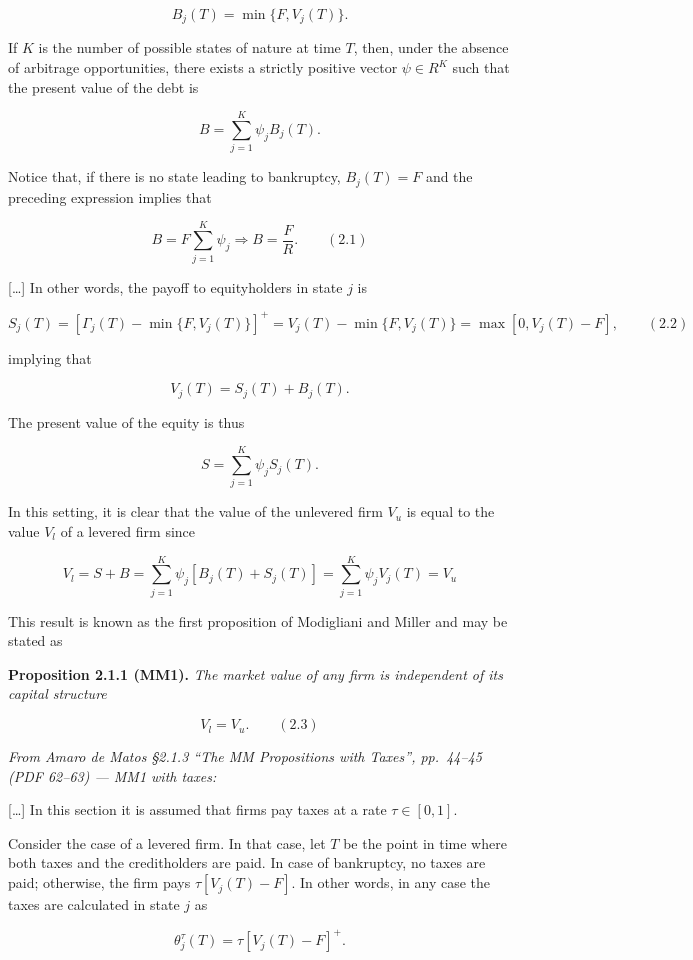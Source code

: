 \documentclass[11pt,a4paper]{article}
\numberwithin{equation}{section}
\begin{document}
\[B_j(T) = \min\{F, V_j(T)\}.\]

If \(K\) is the number of possible states of nature at time \(T\), then, under the absence of
arbitrage opportunities, there exists a strictly positive vector \(\psi \in R^K\) such that the
present value of the debt is

\[B = \sum_{j=1}^{K} \psi_j B_j(T).\]

Notice that, if there is no state leading to bankruptcy, \(B_j(T) = F\) and the preceding expression
implies that

\[B = F \sum_{j=1}^{K} \psi_j \Rightarrow B = \frac{F}{R}. \qquad (2.1)\]

{[}\ldots{]} In other words, the payoff to equityholders in state \(j\) is

\[S_j(T) = [\Gamma_j(T) - \min\{F, V_j(T)\}]^+ = V_j(T) - \min\{F, V_j(T)\} = \max[0, V_j(T) - F], \qquad (2.2)\]

implying that

\[V_j(T) = S_j(T) + B_j(T).\]

The present value of the equity is thus

\[S = \sum_{j=1}^{K} \psi_j S_j(T).\]

In this setting, it is clear that the value of the unlevered firm \(V_u\) is equal to the value
\(V_l\) of a levered firm since

\[V_l = S + B = \sum_{j=1}^{K} \psi_j [B_j(T) + S_j(T)] = \sum_{j=1}^{K} \psi_j V_j(T) = V_u\]

This result is known as the first proposition of Modigliani and Miller and may be stated as

\textbf{Proposition 2.1.1 (MM1).} \emph{The market value of any firm is independent of its capital
structure}

\[V_l = V_u. \qquad (2.3)\]

\emph{From Amaro de Matos §2.1.3 ``The MM Propositions with Taxes'', pp.~44--45 (PDF 62--63) --- MM1
with taxes:}

{[}\ldots{]} In this section it is assumed that firms pay taxes at a rate \(\tau \in [0, 1]\).

Consider the case of a levered firm. In that case, let \(T\) be the point in time where both taxes
and the creditholders are paid. In case of bankruptcy, no taxes are paid; otherwise, the firm pays
\(\tau[V_j(T) - F]\). In other words, in any case the taxes are calculated in state \(j\) as

\[\theta_j^\tau(T) = \tau[V_j(T) - F]^+.\]
\end{document}
